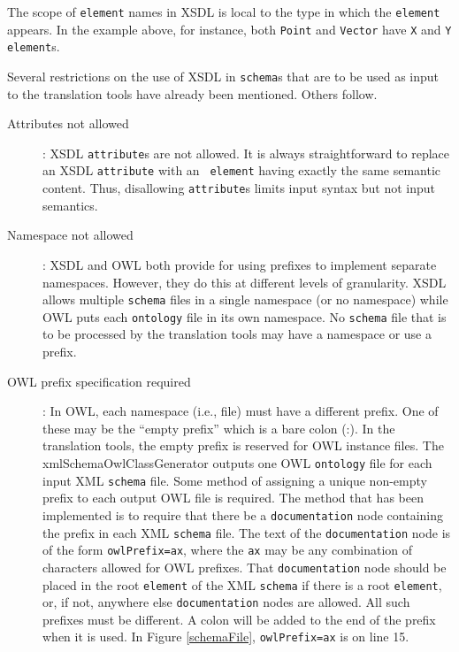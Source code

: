 \documentclass[preprint,12pt]{elsarticle}
\begin{document}
The scope of {\tt element} names in XSDL is local to the type in which the
{\tt element} appears. In the example above, for instance, both {\tt Point}
and {\tt Vector} have {\tt X} and {\tt Y} {\tt element}s.

Several restrictions on the use of XSDL in {\tt schema}s that are to be
used as input to the translation tools have already been mentioned. Others
follow.

\renewcommand{\descriptionlabel}[1]{\hspace{\labelsep}\emph{#1}}

\begin{description}
\item [Attributes not allowed]: XSDL {\tt attribute}s are not allowed. It is
  always straightforward to replace an XSDL {\tt attribute} with an {\tt
    element} having exactly the same semantic content. Thus, disallowing
  {\tt attribute}s limits input syntax but not input semantics.

\item [Namespace not allowed]: XSDL and OWL both provide for using prefixes
  to implement separate namespaces. However, they do this at different
  levels of granularity. XSDL allows multiple {\tt schema} files in a
  single namespace (or no namespace) while OWL puts each {\tt ontology}
  file in its own namespace. No {\tt schema} file that is to be processed
  by the translation tools may have a namespace or use a prefix.

\item [OWL prefix specification required]: In OWL, each namespace (i.e.,
  file) must have a different prefix. One of these may be the “empty
  prefix” which is a bare colon (:). In the translation tools, the empty
  prefix is reserved for OWL instance files. The xmlSchemaOwlClassGenerator
  outputs one OWL {\tt ontology} file for each input XML {\tt schema} file.
  Some method of assigning a unique non-empty prefix to each output OWL
  file is required. The method that has been implemented is to require that
  there be a {\tt documentation} node containing the prefix in each XML
  {\tt schema} file. The text of the {\tt documentation} node is of the
  form {\tt owlPrefix=ax}, where the {\tt ax} may be any combination of
  characters allowed for OWL prefixes. That {\tt documentation} node should
  be placed in the root {\tt element} of the XML {\tt schema} if there is a
  root {\tt element}, or, if not, anywhere else {\tt documentation} nodes are
  allowed. All such prefixes must be different. A colon will be
  added to the end of the prefix when it is used. In Figure
  \ref{schemaFile}, {\tt owlPrefix=ax} is on line 15.


\end{description}
\end{document}
